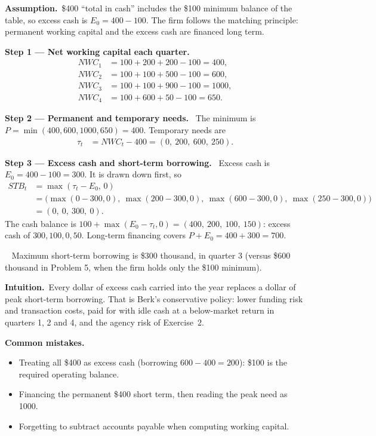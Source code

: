 \documentclass[11pt,a4paper]{article}
\newcommand{\step}[2]{\par\medskip\noindent\textbf{Step #1 --- #2.}~}
\newcommand{\intuition}{\par\medskip\noindent\textbf{Intuition.}~}
\newcommand{\assume}{\par\smallskip\noindent\textbf{Assumption.}~}
\newcommand{\answer}[1]{\par\smallskip\noindent\fbox{\textbf{Answer #1.}}~}
\newcommand{\pitfalls}{\par\medskip\noindent\textbf{Common mistakes.}}
\begin{document}
\assume \$400 ``total in cash'' includes the \$100 minimum balance of the table, so excess cash is $E_0=400-100$. The firm follows the matching principle: permanent working capital and the excess cash are financed long term.

\step{1}{Net working capital each quarter}
\begin{align}
  NWC_1 &= 100+200+200-100 = 400, \nonumber\\
  NWC_2 &= 100+100+500-100 = 600, \nonumber\\
  NWC_3 &= 100+100+900-100 = 1000, \nonumber\\
  NWC_4 &= 100+600+50-100 = 650. \label{r6e5-nwc}
\end{align}

\step{2}{Permanent and temporary needs} The minimum is $P=\min(400,600,1000,650)=400$. Temporary needs are
\begin{align}
  \tau_t &= NWC_t-400 = (0,\ 200,\ 600,\ 250). \label{r6e5-tau}
\end{align}

\step{3}{Excess cash and short-term borrowing} Excess cash is $E_0=400-100=300$. It is drawn down first, so
\begin{align}
  STB_t &= \max(\tau_t-E_0,\,0) \nonumber\\
        &= \big(\max(0-300,0),\ \max(200-300,0),\ \max(600-300,0),\ \max(250-300,0)\big) \nonumber\\
        &= (0,\ 0,\ 300,\ 0). \label{r6e5-stb}
\end{align}
The cash balance is $100+\max(E_0-\tau_t,0)=(400,\ 200,\ 100,\ 150)$: excess cash of $300,100,0,50$. Long-term financing covers $P+E_0=400+300=700$.

\answer{\unskip} Maximum short-term borrowing is \$300 thousand, in quarter 3 (versus \$600 thousand in Problem 5, when the firm holds only the \$100 minimum).

\intuition Every dollar of excess cash carried into the year replaces a dollar of peak short-term borrowing. That is Berk's conservative policy: lower funding risk and transaction costs, paid for with idle cash at a below-market return in quarters 1, 2 and 4, and the agency risk of Exercise~2.

\pitfalls
\begin{itemize}
  \item Treating all \$400 as excess cash (borrowing $600-400=200$): \$100 is the required operating balance.
  \item Financing the permanent \$400 short term, then reading the peak need as 1000.
  \item Forgetting to subtract accounts payable when computing working capital.
\end{itemize}
\end{document}
